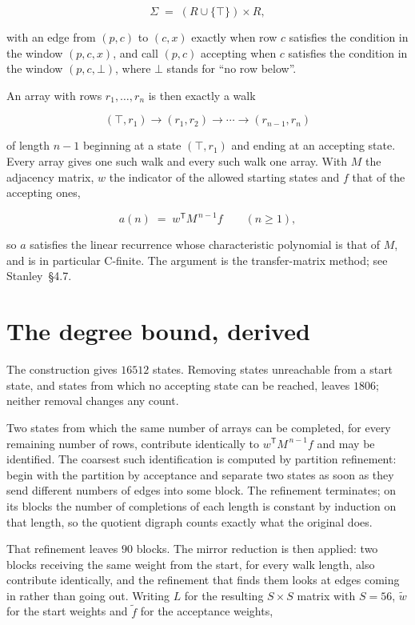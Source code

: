 \documentclass[11pt]{article}
\theoremstyle{definition}
\begin{document}
\[\Sigma \;=\; (R \cup \{\top\}) \times R,\]

with an edge from $(p,c)$ to $(c,x)$ exactly when row $c$ satisfies the condition in the window $(p,c,x)$, and call $(p,c)$ accepting when $c$ satisfies the condition in the window $(p,c,\bot)$, where $\bot$ stands for ``no row below''.

An array with rows $r_1,\dots,r_n$ is then exactly a walk

\[(\top,r_1) \to (r_1,r_2) \to \cdots \to (r_{n-1},r_n)\]

of length $n-1$ beginning at a state $(\top,r_1)$ and ending at an accepting state. Every array gives one such walk and every such walk one array. With $M$ the adjacency matrix, $w$ the indicator of the allowed starting states and $f$ that of the accepting ones,

\[a(n) \;=\; w^{\mathsf T} M^{\,n-1} f \qquad (n \ge 1),\]

so $a$ satisfies the linear recurrence whose characteristic polynomial is that of $M$, and is in particular C-finite. The argument is the transfer-matrix method; see Stanley~\S4.7.

\section{The degree bound, derived}

The construction gives $16512$ states. Removing states unreachable from a start state, and states from which no accepting state can be reached, leaves $1806$; neither removal changes any count.

Two states from which the same number of arrays can be completed, for every remaining number of rows, contribute identically to $w^{\mathsf T}M^{\,n-1}f$ and may be identified. The coarsest such identification is computed by partition refinement: begin with the partition by acceptance and separate two states as soon as they send different numbers of edges into some block. The refinement terminates; on its blocks the number of completions of each length is constant by induction on that length, so the quotient digraph counts exactly what the original does.

That refinement leaves $90$ blocks. The mirror reduction is then applied: two blocks receiving the same weight from the start, for every walk length, also contribute identically, and the refinement that finds them looks at edges coming in rather than going out. Writing $L$ for the resulting $S \times S$ matrix with $S = 56$, $\tilde w$ for the start weights and $\tilde f$ for the acceptance weights,
\end{document}
